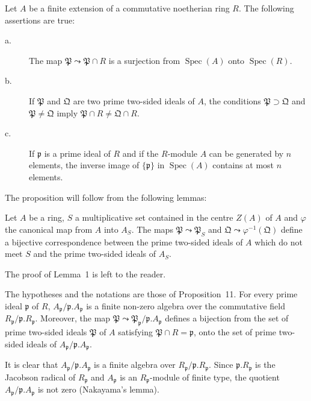 \begin{proposition}
Let $A$ be a finite extension of a commutative noetherian ring $R$.
The following assertions are true:
\begin{description}
\item[\normalfont a.] The map
  $\mathfrak{P}\leadsto\mathfrak{P}\cap R$ is a surjection from
  $\operatorname{Spec}(A)$ onto $\operatorname{Spec}(R)$.
\item[\normalfont b.] If $\mathfrak{P}$ and $\mathfrak{Q}$ are two
  prime two-sided ideals of $A$, the conditions
  $\mathfrak{P}\supset\mathfrak{Q}$ and
  $\mathfrak{P}\ne\mathfrak{Q}$ imply
  $\mathfrak{P}\cap R\ne\mathfrak{Q}\cap R$.
\item[\normalfont c.] If $\mathfrak{p}$ is a prime ideal of $R$ and if
  the $R$-module $A$ can be generated by $n$ elements, the inverse
  image of $\{\mathfrak{p}\}$ in $\operatorname{Spec}(A)$ contains at
  most $n$ elements.
\end{description}
\end{proposition}

The proposition will follow from the following lemmas:

\begin{lemma}
Let $A$ be a ring, $S$ a multiplicative set contained in the centre
$Z(A)$ of $A$ and $\varphi$ the canonical map from $A$ into $A_S$.
The maps $\mathfrak{P}\leadsto\mathfrak{P}_S$ and
$\mathfrak{Q}\leadsto\varphi^{-1}(\mathfrak{Q})$ define a bijective
correspondence between the prime two-sided ideals of $A$ which do not
meet $S$ and the prime two-sided ideals of $A_S$.
\end{lemma}

The proof of Lemma~1 is left to the reader.

\begin{lemma}
The hypotheses and the notations are those of Proposition~11. For
every prime ideal $\mathfrak{p}$ of $R$,
$A_{\mathfrak{p}}/\mathfrak{p}.A_{\mathfrak{p}}$ is a finite non-zero
algebra over the commutative field
$R_{\mathfrak{p}}/\mathfrak{p}.R_{\mathfrak{p}}$. Moreover, the map
$\mathfrak{P}\leadsto\mathfrak{P}_{\mathfrak{p}}/
\mathfrak{p}.A_{\mathfrak{p}}$ defines a bijection from the set of
prime two-sided ideals $\mathfrak{P}$ of $A$ satisfying
$\mathfrak{P}\cap R=\mathfrak{p}$, onto the set of prime two-sided
ideals of $A_{\mathfrak{p}}/\mathfrak{p}.A_{\mathfrak{p}}$.
\end{lemma}

It is clear that $A_{\mathfrak{p}}/\mathfrak{p}.A_{\mathfrak{p}}$ is a
finite algebra over $R_{\mathfrak{p}}/\mathfrak{p}.R_{\mathfrak{p}}$.
Since $\mathfrak{p}.R_{\mathfrak{p}}$ is the Jacobson radical of
$R_{\mathfrak{p}}$ and $A_{\mathfrak{p}}$ is an $R_{\mathfrak{p}}$-module
of finite type, the quotient
$A_{\mathfrak{p}}/\mathfrak{p}.A_{\mathfrak{p}}$ is not zero
(Nakayama's lemma).

